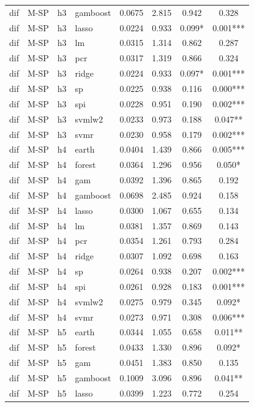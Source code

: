 \begin{ThreePartTable}
\begin{longtable}[t]{llclcccc}
dif & M-SP & h3 & gamboost & 0.0675 & 2.815 & 0.942 & 0.328\\
dif & M-SP & h3 & lasso & 0.0224 & 0.933 & 0.099* & 0.001***\\
dif & M-SP & h3 & lm & 0.0315 & 1.314 & 0.862 & 0.287\\
dif & M-SP & h3 & pcr & 0.0317 & 1.319 & 0.866 & 0.324\\
dif & M-SP & h3 & ridge & 0.0224 & 0.933 & 0.097* & 0.001***\\
dif & M-SP & h3 & sp & 0.0225 & 0.938 & 0.116 & 0.000***\\
dif & M-SP & h3 & spi & 0.0228 & 0.951 & 0.190 & 0.002***\\
dif & M-SP & h3 & svmlw2 & 0.0233 & 0.973 & 0.188 & 0.047**\\
dif & M-SP & h3 & svmr & 0.0230 & 0.958 & 0.179 & 0.002***\\
\addlinespace
dif & M-SP & h4 & earth & 0.0404 & 1.439 & 0.866 & 0.005***\\
dif & M-SP & h4 & forest & 0.0364 & 1.296 & 0.956 & 0.050*\\
dif & M-SP & h4 & gam & 0.0392 & 1.396 & 0.865 & 0.192\\
dif & M-SP & h4 & gamboost & 0.0698 & 2.485 & 0.924 & 0.158\\
dif & M-SP & h4 & lasso & 0.0300 & 1.067 & 0.655 & 0.134\\
dif & M-SP & h4 & lm & 0.0381 & 1.357 & 0.869 & 0.143\\
dif & M-SP & h4 & pcr & 0.0354 & 1.261 & 0.793 & 0.284\\
dif & M-SP & h4 & ridge & 0.0307 & 1.092 & 0.698 & 0.163\\
dif & M-SP & h4 & sp & 0.0264 & 0.938 & 0.207 & 0.002***\\
dif & M-SP & h4 & spi & 0.0261 & 0.928 & 0.183 & 0.001***\\
dif & M-SP & h4 & svmlw2 & 0.0275 & 0.979 & 0.345 & 0.092*\\
dif & M-SP & h4 & svmr & 0.0273 & 0.971 & 0.308 & 0.006***\\
\addlinespace
dif & M-SP & h5 & earth & 0.0344 & 1.055 & 0.658 & 0.011**\\
dif & M-SP & h5 & forest & 0.0433 & 1.330 & 0.896 & 0.092*\\
dif & M-SP & h5 & gam & 0.0451 & 1.383 & 0.850 & 0.135\\
dif & M-SP & h5 & gamboost & 0.1009 & 3.096 & 0.896 & 0.041**\\
dif & M-SP & h5 & lasso & 0.0399 & 1.223 & 0.772 & 0.254\\

\end{longtable}
\end{ThreePartTable}
